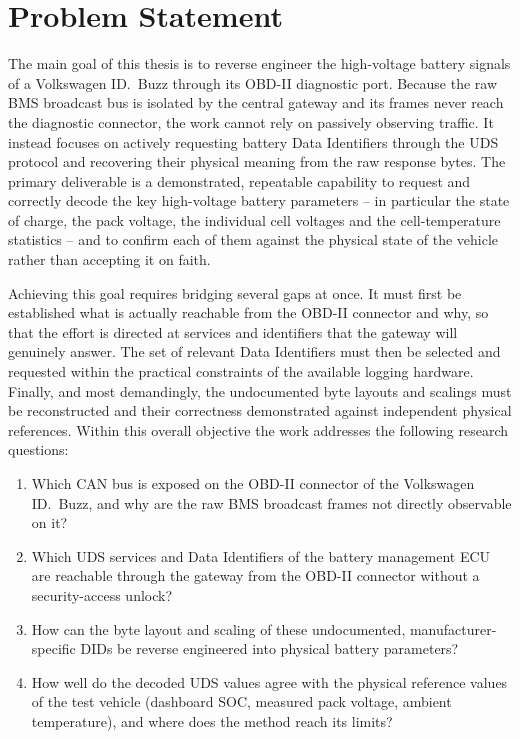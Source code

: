 \documentclass[11pt,a4paper,oneside,parskip=half]{scrreprt}
\begin{document}
\section{Problem Statement}
\label{sec:problem}
The main goal of this thesis is to reverse engineer the high-voltage battery signals of a Volkswagen ID.~Buzz through its OBD-II diagnostic port. Because the raw BMS broadcast bus is isolated by the central gateway and its frames never reach the diagnostic connector, the work cannot rely on passively observing traffic. It instead focuses on actively requesting battery Data Identifiers through the UDS protocol and recovering their physical meaning from the raw response bytes. The primary deliverable is a demonstrated, repeatable capability to request and correctly decode the key high-voltage battery parameters -- in particular the state of charge, the pack voltage, the individual cell voltages and the cell-temperature statistics -- and to confirm each of them against the physical state of the vehicle rather than accepting it on faith.

Achieving this goal requires bridging several gaps at once. It must first be established what is actually reachable from the OBD-II connector and why, so that the effort is directed at services and identifiers that the gateway will genuinely answer. The set of relevant Data Identifiers must then be selected and requested within the practical constraints of the available logging hardware. Finally, and most demandingly, the undocumented byte layouts and scalings must be reconstructed and their correctness demonstrated against independent physical references. Within this overall objective the work addresses the following research questions:

\begin{enumerate}
  \item Which CAN bus is exposed on the OBD-II connector of the Volkswagen ID.~Buzz, and why are the raw BMS broadcast frames not directly observable on it?
  \item Which UDS services and Data Identifiers of the battery management ECU are reachable through the gateway from the OBD-II connector without a security-access unlock?
  \item How can the byte layout and scaling of these undocumented, manufacturer-specific DIDs be reverse engineered into physical battery parameters?
  \item How well do the decoded UDS values agree with the physical reference values of the test vehicle (dashboard SOC, measured pack voltage, ambient temperature), and where does the method reach its limits?
\end{enumerate}
\end{document}
